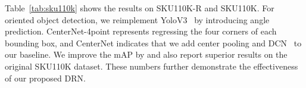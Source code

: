 \documentclass[10pt,twocolumn,letterpaper]{article}
\begin{document}
\begin{table}\centering
{}
\caption{Evaluation results on SKU110K and SKU110K-R.}
\label{tab:sku110k}
\end{table}
 Table~\ref{tab:sku110k} shows the results on SKU110K-R and SKU110K.
For oriented object detection, we reimplement YoloV3~\cite{redmon2018yolov3} by introducing angle prediction.
CenterNet-4point represents regressing the four corners of each bounding box, and CenterNet indicates that we add center pooling and DCN~\cite{dai2017deformable} to our baseline.
We improve the mAP by  and also report superior results on the original SKU110K dataset.
These numbers further demonstrate the effectiveness of our proposed DRN.
\end{document}
